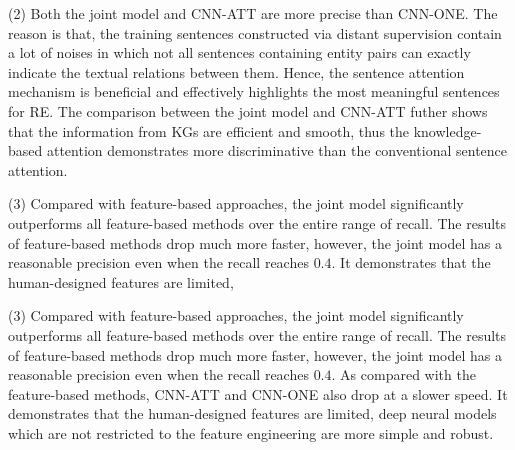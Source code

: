 \documentclass[11pt,a4paper]{article}
\begin{document}
(2) Both the joint model and CNN-ATT are more precise than CNN-ONE. The reason is that, the training sentences constructed via distant supervision contain a lot of noises in which not all sentences containing entity pairs can exactly indicate the textual relations between them. Hence, the sentence attention mechanism is beneficial and effectively highlights the most meaningful sentences for RE. The comparison between the joint model and CNN-ATT futher shows that the information from KGs are efficient and smooth, thus the knowledge-based attention demonstrates more discriminative than the conventional sentence attention.

(3) Compared with feature-based approaches, the joint model significantly outperforms all feature-based methods over the entire range of recall. The results of feature-based methods drop much more faster, however, the joint model has a reasonable precision even when the recall reaches $0.4$. It demonstrates that the human-designed features are limited,



(3) Compared with feature-based approaches, the joint model significantly outperforms all feature-based methods over the entire range of recall. The results of feature-based methods drop much more faster, however, the joint model has a reasonable precision even when the recall reaches $0.4$. As compared with the feature-based methods, CNN-ATT and CNN-ONE also drop at a slower speed. It demonstrates that the human-designed features are limited, deep neural models which are not restricted to the feature engineering are more simple and robust. 










\end{document}
